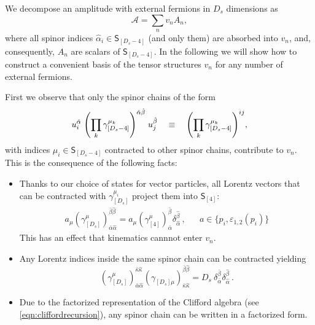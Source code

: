 We decompose an amplitude with external fermions in $D_s$ dimensions as
\begin{equation} \label{eq:tensorDecomposition}
  \mathcal{A} = \sum_n v_n A_n,
\end{equation}
where all spinor indices $\hat{\alpha}_i \in \mathsf{S}_{[D_s-4]}$ (and only them) are absorbed into $v_n$,
and, consequently, $A_n$ are scalars of $\mathsf{S}_{[D_s-4]}$.
In the following we will show how to construct a convenient basis of the tensor structures $v_n$ 
for any number of external fermions.

First we observe that only the spinor chains of the form
\begin{equation}
  u^{\hat{\alpha}}_i \; \qty( \prod_k \gamma^{\mu_k}_{[D_s -4 ]} )^{\hat{\alpha}\hat{\beta}} \; u^{\hat{\beta}}_j \quad\equiv\quad 
  \qty( \prod_k \gamma^{\mu_k}_{[D_s -4 ]} )^{i j},
\end{equation}
with indices $\mu_i \in \mathsf{S}_{[D_s -4]}$ contracted to other spinor chains, contribute to $v_n$.
This is the consequence of the following facts:
\begin{itemize}
  \item Thanks to our choice of states for vector particles, all Lorentz vectors that can be contracted with $\gamma^{\mu_i}_{[D_s]}$
    project them into $\mathsf{S}_{[4]}$:
    \begin{align} \label{eq:trivialTens1}
      a_{\mu}
      \left( \gamma_{[D_s]}^\mu \right)_{\bar{\alpha}\hat{\alpha}}^{\bar{\beta}\hat{\beta}} =
      a_{\mu}\left(\gamma_{[4]}^\mu \right)_{\bar{\alpha}}^{\bar{\beta}} \delta_{\hat{\alpha}}^{\hat{\beta}}\,,
      &&
      a \in \{p_i,\varepsilon_{1,2}(p_i)\}
    \end{align}
    This has an effect that kinematics cannnot enter $v_n$.
  \item Any Lorentz indices inside the same spinor chain can be contracted yielding  
    \begin{equation} \label{eq:trivialTens2}
      \left(\gamma_{[D_s]}^\mu\right)_{\bar{\alpha}\hat{\alpha}}^{\bar{\kappa}\hat{\kappa}}
      \left(\gamma_{[D_s]\mu}^{\phantom{\mu}}\right)_{\bar{\kappa}\hat{\kappa}}^{\bar{\beta}\hat{\beta}}
      =D_s~\delta_{\bar{\alpha}}^{\bar{\beta}}\delta_{\hat{\alpha}}^{\hat{\beta}}\,.
    \end{equation} 
  \item Due to the factorized representation of the Clifford algebra (see \cref{eqn:cliffordrecursion}), any spinor chain can be written in a factorized form.
\end{itemize}
